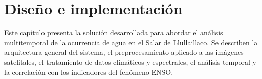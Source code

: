 \chapter{Diseño e implementación} %

\label{Chapter3} %

Este capítulo presenta la solución desarrollada para abordar el análisis multitemporal de la ocurrencia de agua en el Salar de Llullaillaco. Se describen la arquitectura general del sistema, el preprocesamiento aplicado a las imágenes satelitales, el tratamiento de datos climáticos y espectrales, el análisis temporal y la correlación con los indicadores del fenómeno ENSO. 



